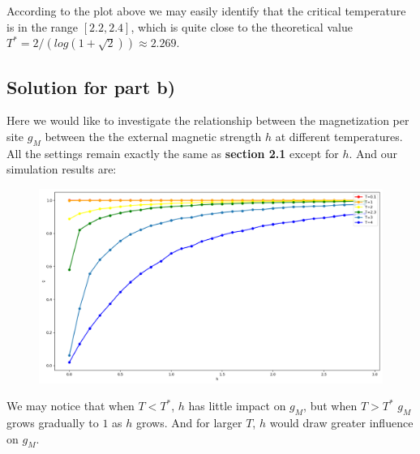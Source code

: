 \documentclass[a4paper]{article}
\begin{document}
According to the plot above we may easily identify that the critical temperature is in the range $[2.2,2.4]$, which is quite close to the theoretical value $T^*=2/(log(1+\sqrt{2}))\approx 2.269$. 

\subsection{Solution for part b)}
Here we would like to investigate the relationship between the magnetization per site $g_M$ between the the external magnetic strength $h$ at different temperatures. All the settings remain exactly the same as \textbf{section 2.1} except for $h$. And our simulation results are:
\begin{figure}[H]
\centering
\includegraphics[scale=0.325]{g.png}
\end{figure}
We may notice that when $T<T^*$, $h$ has little impact on $g_M$, but when $T>T^*$ $g_M$ grows gradually to $1$ as $h$ grows. And for larger $T$, $h$ would draw greater influence on $g_M$.
\end{document}
